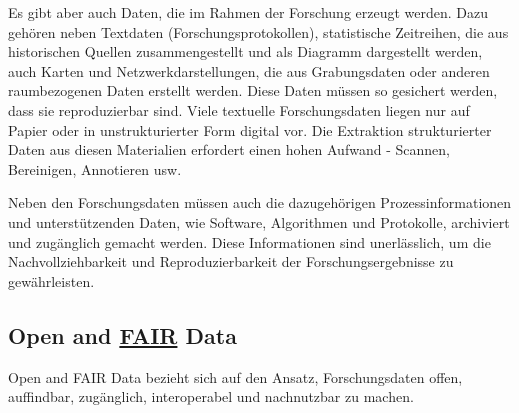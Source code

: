 \documentclass[
  letterpaper,
  DIV=11,
  numbers=noendperiod]{scrartcl}
\begin{document}
Es gibt aber auch Daten, die im Rahmen der Forschung erzeugt werden.
Dazu gehören neben Textdaten (Forschungsprotokollen), statistische
Zeitreihen, die aus historischen Quellen zusammengestellt und als
Diagramm dargestellt werden, auch Karten und Netzwerkdarstellungen, die
aus Grabungsdaten oder anderen raumbezogenen Daten erstellt werden.
Diese Daten müssen so gesichert werden, dass sie reproduzierbar sind.
Viele textuelle Forschungsdaten liegen nur auf Papier oder in
unstrukturierter Form digital vor. Die Extraktion strukturierter Daten
aus diesen Materialien erfordert einen hohen Aufwand - Scannen,
Bereinigen, Annotieren usw.

Neben den Forschungsdaten müssen auch die dazugehörigen
Prozessinformationen und unterstützenden Daten, wie Software,
Algorithmen und Protokolle, archiviert und zugänglich gemacht werden.
Diese Informationen sind unerlässlich, um die Nachvollziehbarkeit und
Reproduzierbarkeit der Forschungsergebnisse zu gewährleisten.

\subsection{\texorpdfstring{Open and
\href{https://www.go-fair.org/fair-principles/}{FAIR}
Data}{Open and FAIR Data}}\label{open-and-fair-data}

Open and FAIR Data bezieht sich auf den Ansatz, Forschungsdaten offen,
auffindbar, zugänglich, interoperabel und nachnutzbar zu machen.
\end{document}
